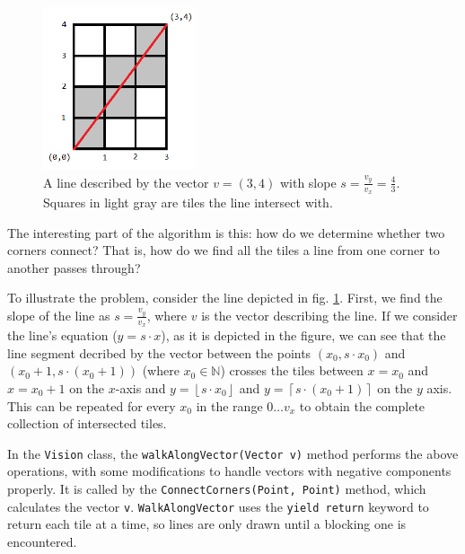 \begin{figure}
\begin{centering}
\includegraphics[width=0.4\textwidth]{tilemapConnection}
\par\end{centering}

\caption{A line described by the vector $v=(3,4)$ with slope $s=\frac{v_{y}}{v_{x}}=\frac{4}{3}$.
Squares in light gray are tiles the line intersect with.\label{fig:ConnectingLine}}
\end{figure}


The interesting part of the algorithm is this: how do we determine
whether two corners connect? That is, how do we find all the tiles
a line from one corner to another passes through? 

To illustrate the problem, consider the line depicted in fig. \ref{fig:ConnectingLine}.
First, we find the slope of the line as $s=\frac{v_{y}}{v_{x}}$,
where $v$ is the vector describing the line. If we consider the line's
equation ($y=s\cdot x$), as it is depicted in the figure, we can
see that the line segment decribed by the vector between the points
$\left(x_{0},s\cdot x_{0}\right)$ and $\left(x_{0}+1,s\cdot\left(x_{0}+1\right)\right)$
(where $x_{0}\in\mathbb{N}$) crosses the tiles between $x=x_{0}$
and $x=x_{0}+1$ on the $x$-axis and $y=\left\lfloor s\cdot x_{0}\right\rfloor $
and $y=\left\lceil s\cdot\left(x_{0}+1\right)\right\rceil $ on the
$y$ axis. This can be repeated for every $x_{0}$ in the range $0\dots v_{x}$
to obtain the complete collection of intersected tiles.

In the \texttt{Vision} class, the \texttt{walkAlongVector(Vector v)}
method performs the above operations, with some modifications to handle
vectors with negative components properly. It is called by the \texttt{ConnectCorners(Point,
Point)} method, which calculates the vector \texttt{v}. \texttt{WalkAlongVector}
uses the \texttt{yield return} keyword to return each tile at a time,
so lines are only drawn until a blocking one is encountered.


